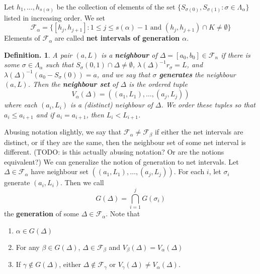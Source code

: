 \documentclass[11pt, a4paper]{memoir}
\newcommand{\mbf}[1]{{\boldmath\bfseries #1}}
\theoremstyle{change}
\theoremstyle{plain}
\theoremstyle{nonumberplain}
\newtheorem{definition}{Definition.}
\numberwithin{equation}{section}
\begin{document}
Let $h_1,\ldots,h_{s(\alpha)}$ be the collection of elements of the set $\{S_{\sigma(0)},S_{\sigma(1)}:\sigma\in\Lambda_\alpha\}$ listed in increasing order.
We set
\begin{equation*}
    \mathcal{F}_\alpha=\{[h_j,h_{j+1}]:1\leq j\leq s(\alpha)-1\text{ and }(h_j,h_{j+1})\cap K\neq\emptyset\}
\end{equation*}
Elements of $\mathcal{F}_\alpha$ are called \mbf{net intervals of generation $\alpha$}.
\begin{definition}
    A pair $(a,L)$ is a \textbf{neighbour} of $\Delta=[a_0,b_0]\in\mathcal{F}_n$ if there is some $\sigma\in\Lambda_\alpha$ such that $S_\sigma(0,1)\cap\Delta\neq\emptyset$, $\lambda(\Delta)^{-1}r_\sigma=L$, and $\lambda(\Delta)^{-1}(a_0-S_\sigma(0))=a$, and we say that $\sigma$ \textbf{generates} the neighbour $(a,L)$.
    Then the \textbf{neighbour set} of $\Delta$ is the ordered tuple
    \begin{equation*}
        V_\alpha(\Delta)=((a_1,L_1),\ldots,(a_j,L_j))
    \end{equation*}
    where each $(a_i,L_i)$ is a (distinct) neighbour of $\Delta$.
    We order these tuples so that $a_i\leq a_{i+1}$ and if $a_i=a_{i+1}$, then $L_i<L_{i+1}$.
\end{definition}
Abusing notation slightly, we say that $\mathcal{F}_\alpha\neq\mathcal{F}_\beta$ if either the net intervals are distinct, or if they are the same, then the neighbour set of some net interval is different.
(TODO: is this actually abusing notation? Or are the notions equivalent?)
We can generalize the notion of generation to net intervals.
Let $\Delta\in\mathcal{F}_\alpha$ have neighbour set $((a_1,L_1),\ldots,(a_j,L_j))$.
For each $i$, let $\sigma_i$ generate $(a_i,L_i)$.
Then we call
\begin{equation*}
    G(\Delta)=\bigcap_{i=1}^j G(\sigma_i)
\end{equation*}
the \textbf{generation} of some $\Delta\in\mathcal{F}_\alpha$.
Note that
\begin{enumerate}[nl,r]
    \item $\alpha\in G(\Delta)$
    \item For any $\beta\in G(\Delta)$, $\Delta\in\mathcal{F}_\beta$ and $V_\beta(\Delta)=V_\alpha(\Delta)$
    \item If $\gamma\notin G(\Delta)$, either $\Delta\notin\mathcal{F}_\gamma$ or $V_\gamma(\Delta)\neq V_\alpha(\Delta)$.
\end{enumerate}
\end{document}

